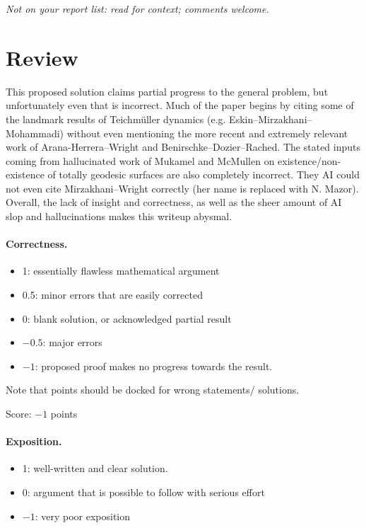 \documentclass[11pt]{article}
\theoremstyle{definition}
\theoremstyle{remark}
\begin{document}
\maketitle
\noindent\textit{Not on your report list: read for context; comments welcome.}

\section{Review}

This proposed solution claims partial progress to the general problem, but unfortunately even that is incorrect. Much of the paper begins by citing some of the landmark results of Teichm\"uller dynamics (e.g. Eskin--Mirzakhani--Mohammadi) without even mentioning the more recent and extremely relevant work of Arana-Herrera--Wright and Benirschke--Dozier--Rached. The stated inputs coming from hallucinated work of Mukamel and McMullen on existence/non-existence of totally geodesic surfaces are also completely incorrect. They AI could not even cite Mirzakhani--Wright correctly (her name is replaced with N. Mazor). Overall, the lack of insight and correctness, as well as the sheer amount of AI slop and hallucinations makes this writeup abysmal.

\paragraph{Correctness.}
\begin{itemize}
	\item  1: essentially flawless mathematical argument
	\item  0.5: minor errors that are easily corrected
	\item  0: blank solution, or acknowledged partial result
	\item  $-0.5$: major errors
	\item  $-1$: proposed proof makes no progress towards the result.
\end{itemize}
Note that points should be docked for wrong statements/ solutions.

\noindent Score: $-1$ points

\paragraph{Exposition.}
\begin{itemize}
	\item  1: well-written and clear solution.
	\item  0: argument that is possible to follow with serious effort
	\item  $-1$: very poor exposition
\end{itemize}
\end{document}
